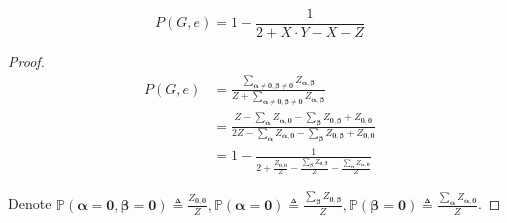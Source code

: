 \begin{lemma}
	
	\begin{equation}
	P(G,e) =  1 - \frac{1}{2 + X \cdot Y - X - Z}
		\label{recursion2}
	\end{equation}

\end{lemma}
\begin{proof}

	\begin{align*}
P(G,e) &= \frac{\sum_{\boldsymbol\alpha \neq \mathbf{0}, \boldsymbol\beta \neq \mathbf{0}} Z_{\boldsymbol\alpha, \boldsymbol\beta}}{Z + \sum_{\boldsymbol\alpha \neq \mathbf{0}, \boldsymbol\beta \neq \mathbf{0}} Z_{\boldsymbol\alpha, \boldsymbol\beta}} \\
&=\frac{Z - \sum_{\boldsymbol\alpha}Z_{\boldsymbol\alpha,\mathbf{0}} - \sum_{\boldsymbol\beta} Z_{\mathbf{0}, \boldsymbol\beta} + Z_{\mathbf{0}, \mathbf{0}}}{2Z - \sum_{\boldsymbol\alpha}Z_{\boldsymbol\alpha,\mathbf{0}} - \sum_{\boldsymbol\beta} Z_{\mathbf{0}, \boldsymbol\beta} + Z_{\mathbf{0}, \mathbf{0}}} \\
&= 1 - \frac{1}{2 + \frac{Z_{\mathbf{0},\mathbf{0}}}{Z} - \frac{\sum_{\boldsymbol\beta} Z_{\mathbf{0}, \boldsymbol\beta} }{Z} - \frac{\sum_{\boldsymbol\alpha} Z_{ \boldsymbol\alpha , \mathbf{0}} }{Z}}
	\end{align*}

	Denote $\mathbb{P} \left( \boldsymbol\alpha = \mathbf{0}, \boldsymbol\beta = \mathbf{0} \right) \triangleq \frac{Z_{\mathbf{0},\mathbf{0}}}{Z}, \mathbb{P} \left( \boldsymbol\alpha = \mathbf{0} \right) \triangleq \frac{\sum_{\boldsymbol\beta} Z_{\mathbf{0}, \boldsymbol\beta} }{Z}, \mathbb{P} \left( \boldsymbol\beta = \mathbf{0} \right) \triangleq \frac{\sum_{\boldsymbol\alpha} Z_{ \boldsymbol\alpha , \mathbf{0}} }{Z}$.


\end{proof}
